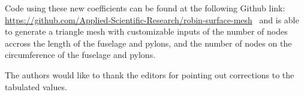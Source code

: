 \documentclass{ahs}
\begin{document}
\begin{table}[ht]
\begin{centering}
\label{pycoeff}
\end{centering}
\end{table}

Code using these 
new coefficients can be found at the following Github link: \url{https://github.com/Applied-Scientific-Research/robin-surface-mesh}~ 
and is able to generate a triangle mesh with customizable inputs of the number of nodes accross the length of the fuselage and pylons, and the number of 
nodes on the circumference of the fuselage and pylons.

The authors would like to thank the editors for pointing out corrections to the tabulated values.



\end{document}
